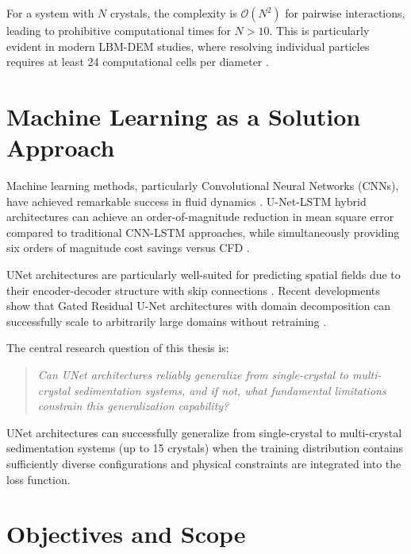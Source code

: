 For a system with $N$ crystals, the complexity is $\mathcal{O}(N^2)$ for pairwise interactions, leading to prohibitive computational times for $N > 10$. This is particularly evident in modern LBM-DEM studies, where resolving individual particles requires at least 24 computational cells per diameter \parencite{zeng2014coupled}.

\section{Machine Learning as a Solution Approach}

Machine learning methods, particularly Convolutional Neural Networks (CNNs), have achieved remarkable success in fluid dynamics \parencite{thuerey2020deep}. U-Net-LSTM hybrid architectures can achieve an order-of-magnitude reduction in mean square error compared to traditional CNN-LSTM approaches, while simultaneously providing six orders of magnitude cost savings versus CFD \parencite{hou2022unet_lstm}.

UNet architectures are particularly well-suited for predicting spatial fields due to their encoder-decoder structure with skip connections \parencite{ronneberger2015unet}. Recent developments show that Gated Residual U-Net architectures with domain decomposition can successfully scale to arbitrarily large domains without retraining \parencite{rana2024scalable_cnn}.

The central research question of this thesis is:

\begin{quote}
\textit{Can UNet architectures reliably generalize from single-crystal to multi-crystal sedimentation systems, and if not, what fundamental limitations constrain this generalization capability?}
\end{quote}

\begin{hypothesis}
\label{hyp:generalization}
UNet architectures can successfully generalize from single-crystal to multi-crystal sedimentation systems (up to 15 crystals) when the training distribution contains sufficiently diverse configurations and physical constraints are integrated into the loss function.
\end{hypothesis}

\section{Objectives and Scope}

